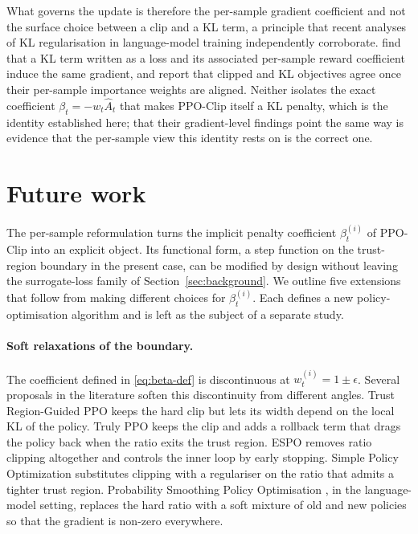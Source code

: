 \documentclass{article}
\begin{document}
What governs the update is therefore the per-sample gradient coefficient
and not the surface choice between a clip and a KL term, a principle that
recent analyses of KL regularisation in language-model training
independently corroborate. \citet{yao2025rethinkingkl} find that a KL term
written as a loss and its associated per-sample reward coefficient induce
the same gradient, and \citet{zhang2026rpg} report that clipped and KL
objectives agree once their per-sample importance weights are aligned.
Neither isolates the exact coefficient $\beta_t = -w_t\hat{A}_t$ that makes
PPO-Clip itself a KL penalty, which is the identity established here; that
their gradient-level findings point the same way is evidence that the
per-sample view this identity rests on is the correct one.



\section{Future work}
\label{sec:future}

The per-sample reformulation turns the implicit penalty coefficient
$\beta_t^{(i)}$ of PPO-Clip into an explicit object. Its functional
form, a step function on the trust-region boundary in the present
case, can be modified by design without leaving the surrogate-loss
family of Section~\ref{sec:background}. We outline five extensions
that follow from making different choices for $\beta_t^{(i)}$. Each
defines a new policy-optimisation algorithm and is left as the
subject of a separate study.

\paragraph{Soft relaxations of the boundary.}
The coefficient defined in \eqref{eq:beta-def} is discontinuous at
$w_t^{(i)} = 1 \pm \epsilon$. Several proposals in the literature
soften this discontinuity from different angles. Trust Region-Guided
PPO \citep{wang2019trgppo} keeps the hard clip but lets its width
depend on the local KL of the policy. Truly PPO
\citep{wang2020trulyppo} keeps the clip and adds a rollback term
that drags the policy back when the ratio exits the trust region.
ESPO \citep{sun2022espo} removes ratio clipping altogether and
controls the inner loop by early stopping. Simple Policy
Optimization \citep{xie2025spo} substitutes clipping with a
regulariser on the ratio that admits a tighter trust region.
Probability Smoothing Policy Optimisation \citep{dwyer2025pspo}, in
the language-model setting, replaces the hard ratio with a soft
mixture of old and new policies so that the gradient is non-zero
everywhere.
\end{document}
